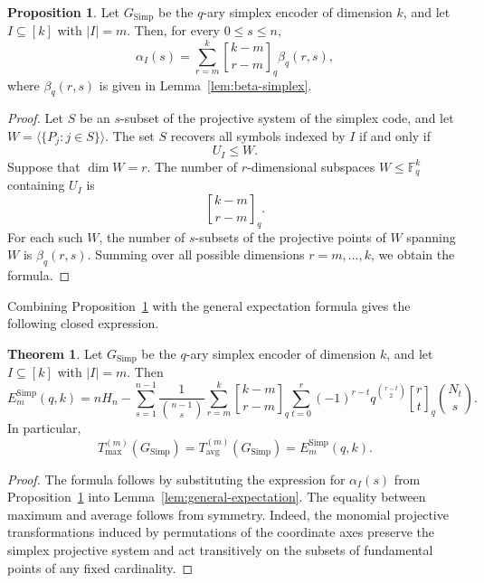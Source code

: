\documentclass[11pt,a4paper]{article}
\numberwithin{equation}{section}
\theoremstyle{definition}
\theoremstyle{definition}
\newtheorem{theorem}[definition]{Theorem}
\newtheorem{proposition}[definition]{Proposition}
\newcommand{\F}{\mathbb{F}}
\newcommand{\Span}{\langle}
\newcommand{\Tmax}{T_{\max}}
\newcommand{\Tavg}{T_{\mathrm{avg}}}
\newcommand{\qbinom}[2]{\genfrac{[}{]}{0pt}{}{#1}{#2}_q}
\begin{document}
\begin{proposition}\label{prop:alpha-simplex-general}
Let $G_{\mathrm{Simp}}$ be the $q$-ary simplex encoder of dimension $k$, and let $I\subseteq[k]$ with $|I|=m$.  Then, for every $0\leq s\leq n$,
\[
\alpha_I(s)
=
\sum_{r=m}^{k}
\qbinom{k-m}{r-m}
\beta_q(r,s),
\]
where $\beta_q(r,s)$ is given in Lemma~\ref{lem:beta-simplex}.
\end{proposition}

\begin{proof}
Let $S$ be an $s$-subset of the projective system of the simplex code, and let $W=\Span\{P_j:j\in S\}\rangle$.  The set $S$ recovers all symbols indexed by $I$ if and only if
\[
U_I\leq W.
\]
Suppose that $\dim W=r$.  The number of $r$-dimensional subspaces $W\leq \F_q^k$ containing $U_I$ is
\[
\qbinom{k-m}{r-m}.
\]
For each such $W$, the number of $s$-subsets of the projective points of $W$ spanning $W$ is $\beta_q(r,s)$.  Summing over all possible dimensions $r=m,\ldots,k$, we obtain the formula.
\end{proof}

Combining Proposition~\ref{prop:alpha-simplex-general} with the general expectation formula gives the following closed expression.

\begin{theorem}\label{thm:simplex-general-expectation}
Let $G_{\mathrm{Simp}}$ be the $q$-ary simplex encoder of dimension $k$, and let $I\subseteq[k]$ with $|I|=m$.  Then
\[
E_m^{\mathrm{Simp}}(q,k)
=
nH_n
-
\sum_{s=1}^{n-1}
\frac{1}{\binom{n-1}{s}}
\sum_{r=m}^{k}
\qbinom{k-m}{r-m}
\sum_{t=0}^{r}
(-1)^{r-t}
q^{\binom{r-t}{2}}
\qbinom{r}{t}
\binom{N_t}{s}.
\]
In particular,
\[
\Tmax^{(m)}(G_{\mathrm{Simp}})
=
\Tavg^{(m)}(G_{\mathrm{Simp}})
=
E_m^{\mathrm{Simp}}(q,k).
\]
\end{theorem}

\begin{proof}
The formula follows by substituting the expression for $\alpha_I(s)$ from Proposition~\ref{prop:alpha-simplex-general} into Lemma~\ref{lem:general-expectation}.  The equality between maximum and average follows from symmetry.  Indeed, the monomial projective transformations induced by permutations of the coordinate axes preserve the simplex projective system and act transitively on the subsets of fundamental points of any fixed cardinality.
\end{proof}
\end{document}
